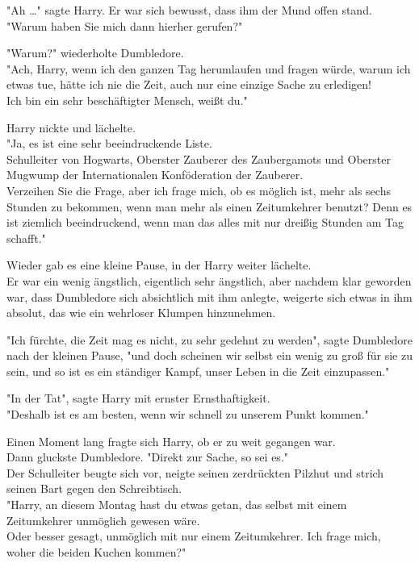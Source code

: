 {"Ah …" sagte Harry. Er war sich bewusst, dass ihm der Mund offen stand.\\ "Warum haben Sie mich dann hierher gerufen?"

"Warum?" wiederholte Dumbledore.\\ "Ach, Harry, wenn ich den ganzen Tag herumlaufen und fragen würde, warum ich etwas tue, hätte ich nie die Zeit, auch nur eine einzige Sache zu erledigen!\\ Ich bin ein sehr beschäftigter Mensch, weißt du."

Harry nickte und lächelte.\\ "Ja, es ist eine sehr beeindruckende Liste.\\ Schulleiter von Hogwarts, Oberster Zauberer des Zaubergamots und Oberster Mugwump der Internationalen Konföderation der Zauberer.\\ Verzeihen Sie die Frage, aber ich frage mich, ob es möglich ist, mehr als sechs Stunden zu bekommen, wenn man mehr als einen Zeitumkehrer benutzt? Denn es ist ziemlich beeindruckend, wenn man das alles mit nur dreißig Stunden am Tag schafft."

Wieder gab es eine kleine Pause, in der Harry weiter lächelte.\\ Er war ein wenig ängstlich, eigentlich sehr ängstlich, aber nachdem klar geworden war, dass Dumbledore sich absichtlich mit ihm anlegte, weigerte sich etwas in ihm absolut, das wie ein wehrloser Klumpen hinzunehmen.

"Ich fürchte, die Zeit mag es nicht, zu sehr gedehnt zu werden", sagte Dumbledore nach der kleinen Pause, "und doch scheinen wir selbst ein wenig zu groß für sie zu sein, und so ist es ein ständiger Kampf, unser Leben in die Zeit einzupassen."

"In der Tat", sagte Harry mit ernster Ernsthaftigkeit.\\ "Deshalb ist es am besten, wenn wir schnell zu unserem Punkt kommen."

Einen Moment lang fragte sich Harry, ob er zu weit gegangen war.\\ Dann gluckste Dumbledore. "Direkt zur Sache, so sei es."\\ Der Schulleiter beugte sich vor, neigte seinen zerdrückten Pilzhut und strich seinen Bart gegen den Schreibtisch.\\ "Harry, an diesem Montag hast du etwas getan, das selbst mit einem Zeitumkehrer unmöglich gewesen wäre.\\ Oder besser gesagt, unmöglich mit nur einem Zeitumkehrer. Ich frage mich, woher die beiden Kuchen kommen?"

}
